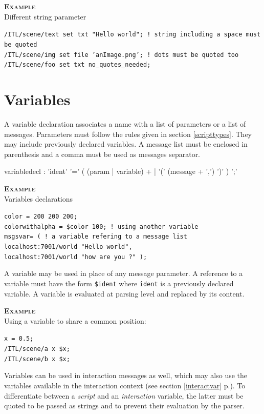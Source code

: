 \documentclass[a4paper,twoside]{report}
\newcommand{\sublevel}[1]	{\section{#1}}
\newcommand{\fullref}[1]	{\ref{#1} p.\pageref{#1}}
\newcommand{\OSC}[1]		{\texttt{#1}}
\newcommand{\example}		{\textbf{\hspace{-1.5cm}\textbf{\textsc{Example }}}}
\newcommand{\sample}	[1]			{\vspace{-2mm}\begin{center}\colorbox{mygrey}{
								\begin{minipage}[t]{0.9\columnwidth} 
								{\small \texttt{#1}}
								\end{minipage}}\end{center}}
\begin{document}
\example \\
Different string parameter
\sample{/ITL/scene/text set txt "Hello world";  ! string including a space must be quoted \\
/ITL/scene/img set file 'anImage.png';  ! dots must be quoted too \\
/ITL/scene/foo set txt no\_quotes\_needed;
}


\sublevel{Variables}\label{scriptvar}

A variable declaration associates a name with a list of parameters or a list of messages.
Parameters must follow the rules given in section \ref{scripttypes}. They may include previously declared variables. A message list must be enclosed in parenthesis and a comma must be used as messages separator.
\begin{rail} 
variabledecl : 'ident' '=' ( (param | variable) +
					| '(' (message + ',') ')' ) ';'
\end{rail}

\example \\
Variables declarations
\sample{color = 200 200 200; \\
colorwithalpha = \$color 100; ! using another variable \\
msgsvar= ( \hspace*{2.7cm}  ! a variable refering to a message list \\
\hspace*{1cm} localhost:7001/world "Hello world", \\
\hspace*{1cm} localhost:7001/world "how are you ?" );
}


A variable may be used in place of any message parameter. A reference to a variable must have the form \OSC{\$ident} where \OSC{ident} is a previously declared variable. A variable is evaluated at parsing level and replaced by its content.

\example \\
Using a variable to share a common position:
\sample{x = 0.5;\\
/ITL/scene/a x \$x;\\
/ITL/scene/b x \$x;
}

Variables can be used in interaction messages as well, which may also use the variables available in the interaction context (see section \fullref{interactvar}). To differentiate between a \emph{script} and an \emph{interaction} variable, the latter must be quoted to be passed as strings and to prevent their evaluation by the parser. 
\end{document}

